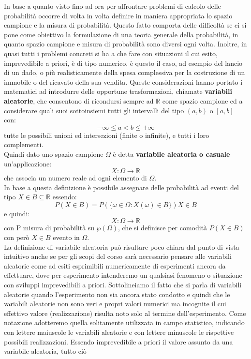 \documentclass[a4paper,12pt, oneside]{book}
\begin{document}
In base a quanto visto fino ad ora per affrontare problemi di calcolo delle probabilità occorre di volta
in volta definire in maniera appropriata lo spazio campione e la misura di probabilità.
Questo fatto comporta delle difficoltà se ci si pone come obiettivo la formulazione di una teoria
generale della probabilità, in quanto spazio campione e misura di probabilità sono diversi ogni volta.
Inoltre, in quasi tutti i problemi concreti si ha a che fare con situazioni il cui esito, imprevedibile a
priori, è di tipo numerico, è questo il caso, ad esempio del lancio di un dado, o più realisticamente
della spesa complessiva per la costruzione di un immobile o del ricavato della sua vendita. Queste considerazioni hanno portato i matematici ad introdurre delle opportune
trasformazioni, chiamate \textbf{variabili aleatorie}, che consentono di ricondursi
sempre ad $\mathbb{R}$ come spazio campione ed a considerare quali suoi sottoinsiemi tutti
gli intervalli del tipo $(a,b)$ o $[a,b]$ con:
\[-\infty\leq a<b\leq +\infty\]
tutte le possibili unioni ed intersezioni (finite o infinite), e tutti i loro complementi.\\
Quindi dato uno spazio campione $\Omega$ è detta \textbf{variabile aleatoria o casuale} un'applicazione:
\[X:\Omega\to\mathbb{R}\]
che associa un numero reale ad ogni elemento di $\Omega$.\\
In base a questa definizione è possibile assegnare delle probabilità ad eventi del tipo $X\in B\subseteq \mathbb{R}$
essendo:
\[P(X\in B)=P(\{\omega\in \Omega:X(\omega)\in B\})X\in B\]
e quindi:
\[X:\Omega\to\mathbb{R}\]
con P misura di probabilità su $\wp(\Omega)$, che si definisce per comodità $P(X\in B)$ con però $X\in B$ evento in $\Omega$.
\\
La definizione di variabile aleatoria può risultare poco chiara dal punto di vista
intuitivo anche se per gli scopi del corso sarà necessario pensare alle variabili
aleatorie come ad esiti esprimibili numericamente di esperimenti ancora da
effettuare, dove per esperimento intenderemo un qualsiasi fenomeno o situazione
con sviluppi imprevedibili a priori.
Sottolineiamo il fatto che si parla di variabili aleatorie quando l'esperimento non
sia ancora stato condotto e quindi che le variabili aleatorie non sono veri e propri
valori numerici ma incognite il cui effettivo valore (realizzazione) risulta noto solo
al termine dell'esperimento.
Come notazione adotteremo quella solitamente utilizzata in campo statistico,
indicando con lettere maiuscole le variabili aleatorie e con lettere minuscole le
rispettive possibili realizzazioni. Essendo imprevedibile a priori il valore assunto da una variabile aleatoria, tutto ciò
\end{document}
